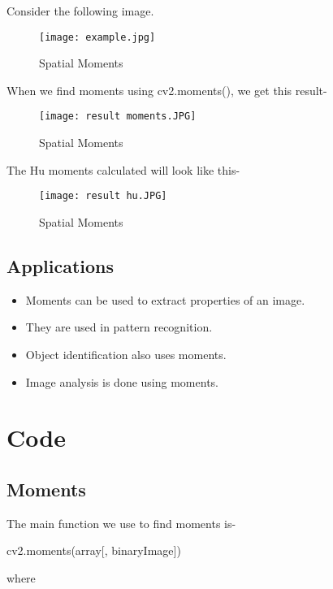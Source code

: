 \documentclass[]{article}
\newenvironment{Shaded}{}{}
\newcommand{\NormalTok}[1]{{#1}}
\providecommand{\tightlist}{%
  \setlength{\itemsep}{0pt}\setlength{\parskip}{0pt}}
\begin{document}
Consider the following image.

\begin{figure}[htbp]
\centering
\texttt{[image: example.jpg]}
\caption{Spatial Moments}
\end{figure}

When we find moments using cv2.moments(), we get this result-

\begin{figure}[htbp]
\centering
\texttt{[image: result moments.JPG]}
\caption{Spatial Moments}
\end{figure}

The Hu moments calculated will look like this-

\begin{figure}[htbp]
\centering
\texttt{[image: result hu.JPG]}
\caption{Spatial Moments}
\end{figure}

\subsection{Applications}\label{applications}

\begin{itemize}
\tightlist
\item
  Moments can be used to extract properties of an image.
\item
  They are used in pattern recognition.
\item
  Object identification also uses moments.
\item
  Image analysis is done using moments.
\end{itemize}

\section{Code}\label{code}

\subsection{Moments}\label{moments}

The main function we use to find moments is-

\begin{Shaded}
\begin{Highlighting}[]
    \NormalTok{cv2.moments(array[, binaryImage])}
\end{Highlighting}
\end{Shaded}

where
\end{document}
